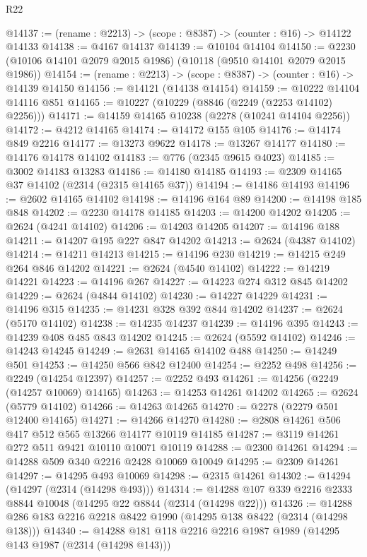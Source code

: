 \begin{lexlean}{R22}
\begin{coremodule}
@14137 := (rename : @2213) -> (scope : @8387) -> (counter : @16) -> @14122 @14133
@14138 := @4167 @14137
@14139 := @10104 @14104
@14150 := @2230 (@10106 @14101 @2079 @2015 @1986) (@10118 (@9510 @14101 @2079 @2015 @1986))
@14154 := (rename : @2213) -> (scope : @8387) -> (counter : @16) -> @14139 @14150
@14156 := @14121 (@14138 @14154)
@14159 := @10222 @14104 @14116 @851
@14165 := @10227 (@10229 (@8846 (@2249 (@2253 @14102) @2256)))
@14171 := @14159 @14165 @10238 (@2278 (@10241 @14104 @2256))
@14172 := @4212 @14165
@14174 := @14172 @155 @105
@14176 := @14174 @849 @2216
@14177 := @13273 @9622
@14178 := @13267 @14177
@14180 := @14176 @14178 @14102
@14183 := @776 (@2345 @9615 @4023)
@14185 := @3002 @14183 @13283
@14186 := @14180 @14185
@14193 := @2309 @14165 @37 @14102 (@2314 (@2315 @14165 @37))
@14194 := @14186 @14193
@14196 := @2602 @14165 @14102
@14198 := @14196 @164 @89
@14200 := @14198 @185 @848
@14202 := @2230 @14178 @14185
@14203 := @14200 @14202
@14205 := @2624 (@4241 @14102)
@14206 := @14203 @14205
@14207 := @14196 @188
@14211 := @14207 @195 @227 @847 @14202
@14213 := @2624 (@4387 @14102)
@14214 := @14211 @14213
@14215 := @14196 @230
@14219 := @14215 @249 @264 @846 @14202
@14221 := @2624 (@4540 @14102)
@14222 := @14219 @14221
@14223 := @14196 @267
@14227 := @14223 @274 @312 @845 @14202
@14229 := @2624 (@4844 @14102)
@14230 := @14227 @14229
@14231 := @14196 @315
@14235 := @14231 @328 @392 @844 @14202
@14237 := @2624 (@5170 @14102)
@14238 := @14235 @14237
@14239 := @14196 @395
@14243 := @14239 @408 @485 @843 @14202
@14245 := @2624 (@5592 @14102)
@14246 := @14243 @14245
@14249 := @2631 @14165 @14102 @488
@14250 := @14249 @501
@14253 := @14250 @566 @842 @12400
@14254 := @2252 @498
@14256 := @2249 (@14254 @12397)
@14257 := @2252 @493
@14261 := @14256 (@2249 (@14257 @10069) @14165)
@14263 := @14253 @14261 @14202
@14265 := @2624 (@5779 @14102)
@14266 := @14263 @14265
@14270 := @2278 (@2279 @501 @12400 @14165)
@14271 := @14266 @14270
@14280 := @2808 @14261 @506 @417 @512 @565 @13266 @14177 @10119 @14185
@14287 := @3119 @14261 @272 @511 @9421 @10110 @10071 @10119
@14288 := @2300 @14261
@14294 := @14288 @509 @340 @2216 @2428 @10069 @10049
@14295 := @2309 @14261
@14297 := @14295 @493 @10069
@14298 := @2315 @14261
@14302 := @14294 (@14297 (@2314 (@14298 @493)))
@14314 := @14288 @107 @339 @2216 @2333 @8844 @10048 (@14295 @22 @8844 (@2314 (@14298 @22)))
@14326 := @14288 @286 @183 @2216 @2218 @8422 @1990 (@14295 @138 @8422 (@2314 (@14298 @138)))
@14340 := @14288
    @181
    @118
    @2216
    @2216
    @1987
    @1989
    (@14295 @143 @1987 (@2314 (@14298 @143)))

\end{coremodule}
\end{lexlean}
